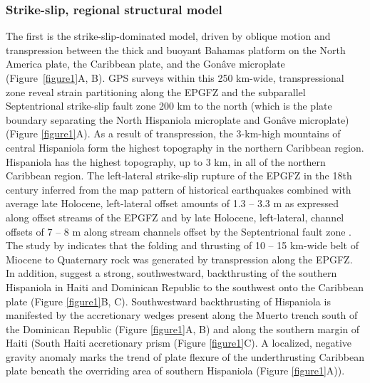 \documentclass[linenumbers,draft]{agujournal}
\begin{document}
\subsubsection{Strike-slip, regional structural model}
The first is the strike-slip-dominated model, driven by oblique motion and transpression between the thick and buoyant Bahamas platform on the North America plate, the Caribbean plate, and the Gon\^ave microplate \citep{mann1995actively,dolan1998active,mann2002oblique,calais2002strain,calais2016plate} (Figure~\ref{figure1}A, B). GPS surveys within this 250 km-wide, transpressional zone \citep{calais2002strain,calais2010transpressional,hayes2010complex,symithe2013coseismic,douilly2013crustal,douilly2015three} reveal strain partitioning along the EPGFZ and the subparallel Septentrional strike-slip fault zone 200 km to the north (which is the plate boundary separating the North Hispaniola microplate and Gon\^ave microplate) (Figure {\ref{figure1}}A). As a result of transpression, the 3-km-high mountains of central Hispaniola form the highest topography in the northern Caribbean region. Hispaniola has the highest topography, up to 3 km, in all of the northern Caribbean region. The left-lateral strike-slip rupture of the EPGFZ in the 18th century inferred from the map pattern of historical earthquakes \citep{bakun2012significant} combined with average late Holocene, left-lateral offset amounts of 1.3 -- 3.3 m as expressed along offset streams of the EPGFZ \citep{prentice2010seismic} and by late Holocene, left-lateral, channel offsets of 7 -- 8 m along stream channels offset by the Septentrional fault zone \citep{prentice1993paleoseismicity,leroy2015segmentation}. The study by \citet{saint2015seismotectonics} indicates that the folding and thrusting of 10 -- 15 km-wide belt of Miocene to Quaternary rock was generated by transpression along the EPGFZ. In addition, \citet{mann2002oblique,grindlay2005high,kroehler2011late} suggest a strong, southwestward, backthrusting of the southern Hispaniola in Haiti and Dominican Republic to the southwest onto the Caribbean plate (Figure \ref{figure1}B, C). Southwestward backthrusting of Hispaniola is manifested by the accretionary wedges present along the Muerto trench south of the Dominican Republic \citep{bien1986contribution,bruna2009morphotectonics} (Figure \ref{figure1}A, B) and along the southern margin of Haiti (South Haiti accretionary prism \citep{bien1986contribution} (Figure \ref{figure1}C). A localized, negative gravity anomaly marks the trend of plate flexure of the underthrusting Caribbean plate beneath the overriding area of southern Hispaniola \citep{mann2002oblique,bruna2009morphotectonics} (Figure \ref{figure1}A)).
\end{document}
